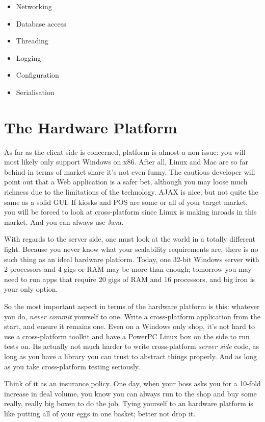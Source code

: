 \documentclass{book}
\begin{document}
\begin{itemize}
\item Networking
\item Database access
\item Threading
\item Logging
\item Configuration
\item Serialisation
\end{itemize}

\section{The Hardware Platform}

As far as the client side is concerned, platform is almost a
non-issue: you will most likely only support Windows on x86. After
all, Linux and Mac are so far behind in terms of market share it's not
even funny. The cautious developer will point out that a Web
application is a safer bet, although you may loose much richness due
to the limitations of the technology. AJAX is nice, but not quite the
same as a solid GUI. If kiosks and POS are some or all of your target
market, you will be forced to look at cross-platform since Linux is
making inroads in this market. And you can always use Java.

With regards to the server side, one must look at the world in a
totally different light. Because you never know what your scalability
requirements are, there is no such thing as an ideal hardware
platform. Today, one 32-bit Windows server with 2 processors and 4
gigs or RAM may be more than enough; tomorrow you may need to run apps
that require 20 gigs of RAM and 16 processors, and big iron is your
only option.

So the most important aspect in terms of the hardware platform is
this: whatever you do, \emph{never commit} yourself to one. Write a
cross-platform application from the start, and ensure it remains
one. Even on a Windows only shop, it's not hard to use a
cross-platform toolkit and have a PowerPC Linux box on the side to run
tests on. Its actually not much harder to write cross-platform
\emph{server side} code, as long as you have a library you can trust
to abstract things properly. And as long as you take cross-platform
testing seriously.

Think of it as an insurance policy. One day, when your boss asks you
for a 10-fold increase in deal volume, you know you can always run to
the shop and buy some really, really big boxen to do the job. Tying
yourself to an hardware platform is like putting all of your eggs in
one basket; better not drop it.
\end{document}
